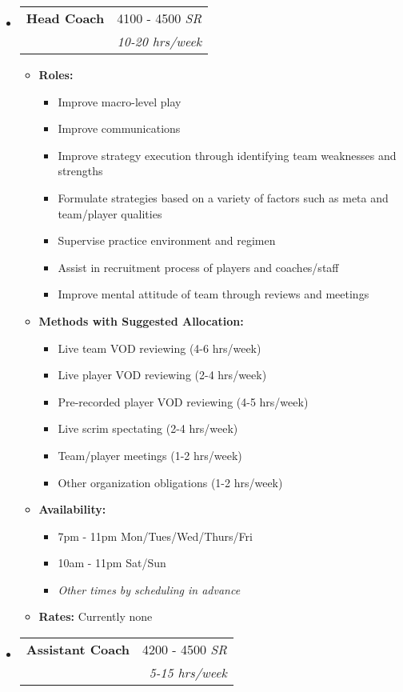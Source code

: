 \documentclass[letterpaper,11pt]{article}
\makeatletter
\newcommand{\resitem}[1]{\item #1 \vspace{-2pt}}
\newcommand{\ressubheading}[4]{
\begin{tabular*}{6.5in}{l@{\cftdotfill{\cftsecdotsep}\extracolsep{\fill}}r}
		\textbf{#1} & #2 \\
		\textit{#3} & \textit{#4} \\
\end{tabular*}\vspace{-6pt}}
\makeatother
\begin{document}
\begin{itemize}

\item[]

	\ressubheading{Head Coach}{4100 - 4500 \textit{SR}}{}{\textit{10-20 hrs/week}}

  \begin{itemize}
		\resitem{\textbf{Roles:}
    \begin{itemize}
    \item Improve macro-level play
    \item Improve communications
    \item Improve strategy execution through identifying team weaknesses and strengths
    \item Formulate strategies based on a variety of factors such as meta and team/player qualities
    \item Supervise practice environment and regimen
    \item Assist in recruitment process of players and coaches/staff
    \item Improve mental attitude of team through reviews and meetings
    \end{itemize}}
    \resitem{\textbf{Methods with Suggested Allocation:}
    \begin{itemize}
    \item Live team VOD reviewing (4-6 hrs/week)
    \item Live player VOD reviewing (2-4 hrs/week)
    \item Pre-recorded player VOD reviewing (4-5 hrs/week)
    \item Live scrim spectating (2-4 hrs/week)
    \item Team/player meetings (1-2 hrs/week)
    \item Other organization obligations (1-2 hrs/week)
    \end{itemize}}
    \resitem{\textbf{Availability:}
    \begin{itemize}
    \item 7pm - 11pm Mon/Tues/Wed/Thurs/Fri
    \item 10am - 11pm Sat/Sun
    \item \textit{Other times by scheduling in advance}
    \end{itemize}}
    \resitem{\textbf{Rates:} Currently none}
	\end{itemize}

\item[]

  \ressubheading{Assistant Coach}{4200 - 4500 \textit{SR}}{}{\textit{5-15 hrs/week}}


\end{itemize}
\end{document}

